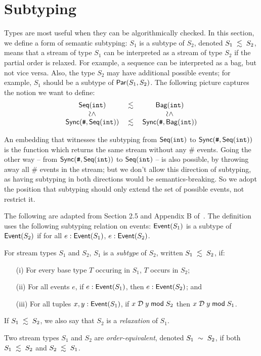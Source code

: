 \section{Subtyping}

Types are most useful when they can be algorithmically checked.
In this section, we define a form of semantic subtyping: $S_1$ is a subtype of $S_2$, denoted $S_1 \; \lesssim \; S_2$, means that a stream of type $S_1$ can be interpreted as a stream of type $S_2$ if the partial order is relaxed.
For example, a sequence can be interpreted as a bag, but not vice versa.
Also, the type $S_2$ may have additional possible events;
for example, $S_1$ should be a subtype of $\mathsf{Par}({S_1}, {S_2})$.
The following picture captures the notion we want to define:
\[
\begin{array}{ccc}
\seqint{} & \subtype & \relint{} \\
\subtypevert & & \subtypevert \\
\synchseqint{} & \subtype & \synchrelint{}
\end{array}
\]

An embedding that witnesses the subtyping from $\mathsf{Seq}({\texttt{int}}){}$ to $\mathsf{Sync}({\texttt{\#}}, \mathsf{Seq}({\texttt{int}}){}){}$ is the function which returns the same stream without any $\#$ events. Going the other way -- from $\mathsf{Sync}({\texttt{\#}}, \mathsf{Seq}({\texttt{int}}){}){}$ to $\mathsf{Seq}({\texttt{int}}){}$ -- is also possible, by throwing away all $\#$ events in the stream; but we don't allow this direction of subtyping, as having subtyping in both directions would be semantics-breaking. So we adopt the position that subtyping should only extend the set of possible events, not restrict it.

The following are adapted from Section 2.5 and Appendix B of~.
The definition uses the following subtyping relation on events: $\mathsf{Event}(S_1)$ is a subtype of $\mathsf{Event}(S_2)$ if for all $e: \mathsf{Event}({S_1})$, $e: \mathsf{Event}({S_2})$.

\begin{definition}[Subtyping]
\label{def:stream-relaxation}
For stream types $S_1$ and $S_2$,
$S_1$ is a \emph{subtype} of $S_2$, written $S_1 \; \lesssim \; S_2$, if:
\begin{enumerate}
\item[(i)] For every base type $T$ occuring in $S_1$, $T$ occurs in $S_2$;
\item[(ii)] For all events $e$, if $e: \mathsf{Event}({S_1})$, then $e: \mathsf{Event}({S_2})$; and
\item[(iii)] For all tuples $x, y: \mathsf{Event}({S_1})$,
if $x \;\mathcal{D}\; y \;\mathsf{mod}\; {S_2}$ then $x \;\mathcal{D}\; y \;\mathsf{mod}\; {S_1}$.
\end{enumerate}

If $S_1 \; \lesssim \; S_2$, we also say that $S_2$ is a \emph{relaxation} of $S_1$.

Two stream types $S_1$ and $S_2$ are \emph{order-equivalent}, denoted $S_1 \; \sim \; S_2$, if both $S_1 \; \lesssim \; S_2$ and $S_2 \; \lesssim \; S_1$.
\end{definition}

